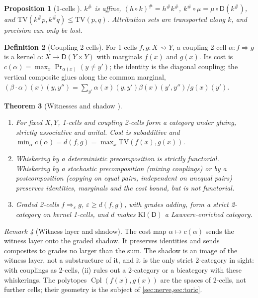 \documentclass[11pt]{article}
\newtheorem{theorem}{Theorem}[section]
\newtheorem{proposition}[theorem]{Proposition}
\theoremstyle{definition}
\newtheorem{definition}[theorem]{Definition}
\theoremstyle{remark}
\newtheorem{remark}[theorem]{Remark}
\newcommand{\D}{\mathsf{D}}
\newcommand{\Kl}{\mathrm{Kl}}
\newcommand{\Cpl}{\operatorname{Cpl}}
\newcommand{\TV}{\mathrm{TV}}
\begin{document}
\begin{proposition}[1-cells {\cite[Props.~7.2, 7.3]{Awasthi-Attribution}}]\label{prop:1cells}
$k^\#$ is affine, $(h\circ k)^\#=h^\#k^\#$, $k^\#\circ\mu=\mu\circ\D(k^\#)$, and
$\TV(k^\#p,k^\#q)\le\TV(p,q)$. Attribution sets are transported along $k$, and precision can only be lost.
\end{proposition}

\begin{definition}[Coupling 2-cells]\label{def:coupling}
For 1-cells $f,g\colon X\rightsquigarrow Y$, a coupling 2-cell $\alpha\colon f\Rightarrow g$ is a kernel
$\alpha\colon X\to\D(Y\times Y)$ with marginals $f(x)$ and $g(x)$. Its cost is
$c(\alpha)=\max_x\Pr_{\alpha(x)}(y\ne y')$; the identity is the diagonal coupling; the vertical
composite glues along the common marginal,
$(\beta\cdot\alpha)(x)(y,y'')=\sum_{y'}\alpha(x)(y,y')\beta(x)(y',y'')/g(x)(y')$.
\end{definition}

\begin{theorem}[Witnesses and shadow {\cite[Thms.~7.6, 7.8]{Awasthi-Attribution}}]\label{thm:witness}
\leavevmode
\begin{enumerate}[label=(\roman*)]
\item For fixed $X,Y$, 1-cells and coupling 2-cells form a category under gluing, strictly
  associative and unital. Cost is subadditive and $\min_\alpha c(\alpha)=d(f,g)=\max_x\TV(f(x),g(x))$.
\item Whiskering by a deterministic precomposition is strictly functorial. Whiskering by a stochastic
  precomposition (mixing couplings) or by a postcomposition (copying on equal pairs, independent on
  unequal pairs) preserves identities, marginals and the cost bound, but is not functorial.
\item Graded 2-cells $f\Rightarrow_\varepsilon g$, $\varepsilon\ge d(f,g)$, with grades adding, form a strict
  2-category on kernel 1-cells, and $d$ makes $\Kl(\D)$ a Lawvere-enriched category.
\end{enumerate}
\end{theorem}

\begin{remark}[Witness layer and shadow]\label{rem:shadow}
The cost map $\alpha\mapsto c(\alpha)$ sends the witness layer onto the graded shadow. It preserves identities and
sends composites to grades no larger than the sum. The shadow is an image of the witness layer, not a
substructure of it, and it is the only strict 2-category in sight: with couplings as 2-cells, (ii) rules out a
2-category or a bicategory with these whiskerings. The polytopes $\Cpl(f(x),g(x))$ are the spaces of 2-cells, not
further cells; their geometry is the subject of \cref{sec:nerve,sec:toric}.
\end{remark}
\end{document}
